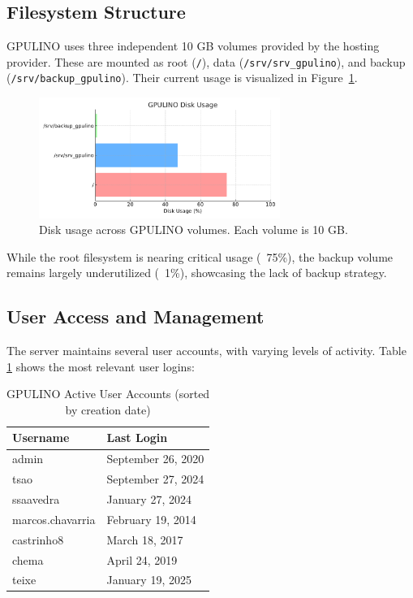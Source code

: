 \subsection{Filesystem Structure}

GPULINO uses three independent 10 GB volumes provided by the hosting provider. These are mounted as root (\verb|/|), data (\verb|/srv/srv_gpulino|), and backup (\verb|/srv/backup_gpulino|). Their current usage is visualized in Figure~\ref{fig:gpulino_disk_usage}.

\begin{figure}[H]
  \centering
  \includegraphics[width=0.7\textwidth]{figuras/gpulino_disk_usage.pdf}
  \caption{Disk usage across GPULINO volumes. Each volume is 10 GB.}
  \label{fig:gpulino_disk_usage}
\end{figure}

While the root filesystem is nearing critical usage (~75\%), the backup volume remains largely underutilized (~1\%), showcasing the lack of backup strategy.

\subsection{User Access and Management}

The server maintains several user accounts, with varying levels of activity. Table \ref{tab:gpulino_users} shows the most relevant user logins:

\begin{table}[H]
  \centering
  \caption{GPULINO Active User Accounts (sorted by creation date)}
  \label{tab:gpulino_users}
  \begin{tabular}{ll}
    \rowcolor{udcpink!25}
    \textbf{Username} & \textbf{Last Login} \\
    \hline
    admin & September 26, 2020 \\
    tsao & September 27, 2024 \\
    ssaavedra & January 27, 2024 \\
    marcos.chavarria & February 19, 2014 \\
    castrinho8 & March 18, 2017 \\
    chema & April 24, 2019 \\
    teixe & January 19, 2025 \\
  \end{tabular}
\end{table}

